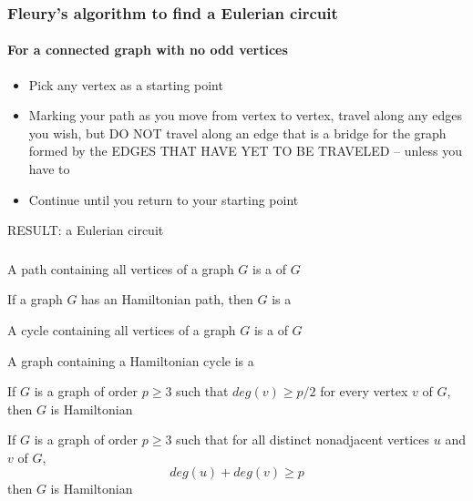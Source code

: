 \documentclass[aspectratio=169]{beamer}\usepackage[]{graphicx}\usepackage[]{xcolor}
\begin{document}
\begin{frame}
	\frametitle{Fleury's algorithm to find a Eulerian circuit}
	\framesubtitle{For a connected graph with no odd vertices}

	\begin{itemize}
	\item Pick any vertex as a starting point
	\item Marking your path as you move from vertex to vertex, travel along any edges you wish, but DO NOT travel along an edge that is a bridge for the graph formed by the EDGES THAT HAVE YET TO BE TRAVELED -- unless you have to
	\item Continue until you return to your starting point
\end{itemize}
RESULT: a Eulerian circuit
\end{frame}




\begin{frame}\frametitle{}
\begin{definition}
	A path containing all vertices of a graph $G$ is a  of $G$
\end{definition}
\vfill
\begin{definition}
	If a graph $G$ has an Hamiltonian path, then $G$ is a 
\end{definition}
\vfill
\begin{definition}
	A cycle containing all vertices of a graph $G$ is a  of $G$
\end{definition}
\vfill
\begin{definition}
	A graph containing a Hamiltonian cycle is a 
\end{definition}
\end{frame}

\begin{frame}
\begin{theorem}
	If $G$ is a graph of order $p\geq 3$ such that $deg(v)\geq p/2$ for every vertex $v$ of $G$, then $G$ is Hamiltonian
\end{theorem}
\vfill
\begin{theorem}
	If $G$ is a graph of order $p\geq 3$ such that for all distinct nonadjacent vertices $u$ and $v$ of $G$, $$deg(u)+deg(v)\geq p$$ 
	then $G$ is Hamiltonian
\end{theorem}
\end{frame}
\end{document}
